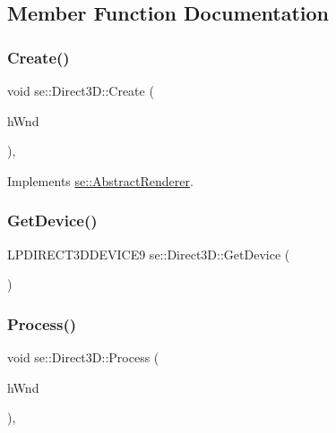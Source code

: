 \subsection{Member Function Documentation}
\mbox{\label{classse_1_1_direct3_d_a316456762829db0614077cccd655e654}} 
\subsubsection{\texorpdfstring{Create()}{Create()}}
{\footnotesize\ttfamily void se\+::\+Direct3\+D\+::\+Create (\begin{DoxyParamCaption}\item[{H\+W\+ND}]{h\+Wnd }\end{DoxyParamCaption})\hspace{0.3cm}{\ttfamily [override]}, {\ttfamily [virtual]}}



Implements \mbox{\hyperlink{classse_1_1_abstract_renderer_afdfce8b91028448c17ce27550827f192}{se\+::\+Abstract\+Renderer}}.

\mbox{\label{classse_1_1_direct3_d_a0735c84f0cdd65088702b03c4ed7c7b7}} 
\subsubsection{\texorpdfstring{Get\+Device()}{GetDevice()}}
{\footnotesize\ttfamily L\+P\+D\+I\+R\+E\+C\+T3\+D\+D\+E\+V\+I\+C\+E9 se\+::\+Direct3\+D\+::\+Get\+Device (\begin{DoxyParamCaption}{ }\end{DoxyParamCaption})}

\mbox{\label{classse_1_1_direct3_d_a64e4eb2d2516261468e2e23c92dec1b4}} 
\subsubsection{\texorpdfstring{Process()}{Process()}}
{\footnotesize\ttfamily void se\+::\+Direct3\+D\+::\+Process (\begin{DoxyParamCaption}\item[{H\+W\+ND}]{h\+Wnd }\end{DoxyParamCaption})\hspace{0.3cm}{\ttfamily [override]}, {\ttfamily [virtual]}}



